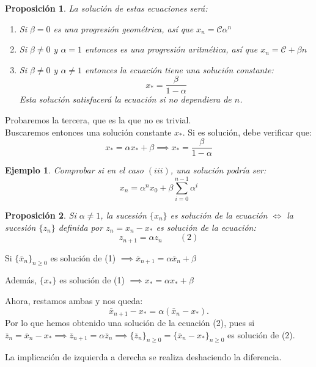 \documentclass[11pt, a4paper, titlepage]{article}
\makeatletter
\renewenvironment{proof}[1][\proofname] {\vspace{-15pt}\par\pushQED{\qed}\normalfont\topsep6\p@\@plus6\p@\relax\trivlist\item[\hskip\labelsep\it#1\@addpunct{.}]\ignorespaces}{\popQED\endtrivlist\@endpefalse}
\theoremstyle{theorem-style}
\newtheorem*{nprop}{Proposición}
\theoremstyle{definition-style}
\theoremstyle{remark-style}
\theoremstyle{example-style}
\newtheorem*{ejemplo}{Ejemplo}
\newenvironment{nlist}
{\begin{enumerate}
\renewcommand\labelenumi{(\emph{\roman{enumi})}}}
{\end{enumerate}}
\makeatother
\begin{document}
\begin{nprop}
	La solución de estas ecuaciones será:
	\begin{nlist}
	\item Si $\beta = 0$ es una progresión geométrica, así que $x_n =  \mathcal{C} \alpha^n$
	\item Si $\beta \ne 0$ y $\alpha  = 1$ entonces es una progresión aritmética, así que $x_n = \mathcal{C} + \beta n$
	\item Si $\beta \ne 0 $ y $\alpha \ne 1 $ entonces la ecuación tiene una solución constante:
	\[
	x_* = \frac{\beta}{1-\alpha}
	\]
	Esta solución satisfacerá la ecuación si no dependiera de $n$.
\end{nlist}
\end{nprop}
\begin{proof}
	Probaremos la tercera, que es la que no es trivial.\\
	Buscaremos entonces una solución constante $x_*$. Si es solución, debe verificar que:
$$x_* =  \alpha x_* + \beta \implies  x_* = \dfrac{\beta}{1 - \alpha}$$
\end{proof}

\begin{ejemplo}
	Comprobar si en el caso $(iii)$, una solución podría ser: \[x_n = \alpha^n x_0 + \beta \sum_{i=0}^{n-1}\alpha^i\]
\end{ejemplo}


\begin{nprop}
	Si $\alpha \ne 1$, la sucesión $\{x_n\}$ es solución de la ecuación $\iff$ la sucesión $\{z_n\}$ definida por $z_n = x_n - x_*$ es solución de la ecuación:
	\[
	z_{n+1} =  \alpha z_n\quad \quad (2)
	\]
\end{nprop}
\begin{proof}
	Si $\{\bar{x}_n\}_{n\geq 0}$ es solución de (1) $\implies \bar{x}_{n+1}= \alpha\bar{x}_n+\beta$
	
	
	Además, $\{x_*\}$ es solución de (1) $\implies x_*= \alpha x_*+\beta$
	
	Ahora, restamos ambas y nos queda:
	\[
	\bar{x}_{n+1} - x_*= \alpha (\bar{x}_n - x_*).
	\]
	Por lo que hemos obtenido una solución de la ecuación (2), pues si $\bar{z}_n= \bar{x}_n - x_*\implies \bar{z}_{n+1}= \alpha \bar{z}_n \implies \{\bar{z}_n\}_{n \ge 0} = \{\bar{x}_n - x_*\}_{n \ge 0}$ es solución de (2).
	
	La implicación de izquierda a derecha se realiza deshaciendo la diferencia.
	
\end{proof}
\end{document}
